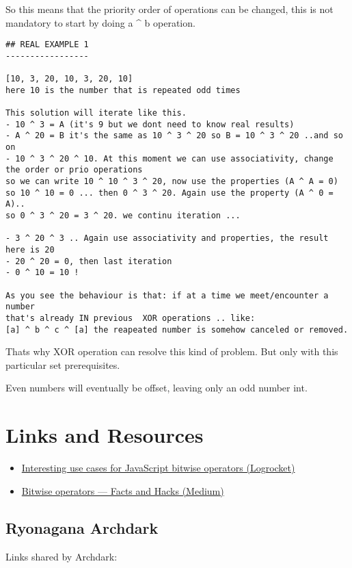 \documentclass[11pt]{article}
\begin{document}
So this means that the priority order of operations can be changed, this is not mandatory to start by doing a \^{} b operation.

\begin{verbatim}
## REAL EXAMPLE 1
-----------------

[10, 3, 20, 10, 3, 20, 10]
here 10 is the number that is repeated odd times

This solution will iterate like this.
- 10 ^ 3 = A (it's 9 but we dont need to know real results)
- A ^ 20 = B it's the same as 10 ^ 3 ^ 20 so B = 10 ^ 3 ^ 20 ..and so on
- 10 ^ 3 ^ 20 ^ 10. At this moment we can use associativity, change
the order or prio operations
so we can write 10 ^ 10 ^ 3 ^ 20, now use the properties (A ^ A = 0)
so 10 ^ 10 = 0 ... then 0 ^ 3 ^ 20. Again use the property (A ^ 0 = A)..
so 0 ^ 3 ^ 20 = 3 ^ 20. we continu iteration ...

- 3 ^ 20 ^ 3 .. Again use associativity and properties, the result here is 20
- 20 ^ 20 = 0, then last iteration
- 0 ^ 10 = 10 !

As you see the behaviour is that: if at a time we meet/encounter a number
that's already IN previous  XOR operations .. like:
[a] ^ b ^ c ^ [a] the reapeated number is somehow canceled or removed.
\end{verbatim}


Thats why XOR operation can resolve this kind of problem. But only with this particular set prerequisites.

Even numbers will eventually be offset, leaving only an odd number int.



\section{Links and Resources}
\label{sec:org656a7a6}
\begin{itemize}
\item \href{https://blog.logrocket.com/interesting-use-cases-for-javascript-bitwise-operators/}{Interesting use cases for JavaScript bitwise operators (Logrocket)}
\item \href{https://medium.com/@shashankmohabia/bitwise-operators-facts-and-hacks-903ca516f28c}{Bitwise operators — Facts and Hacks (Medium)}
\end{itemize}


\subsection{Ryonagana Archdark}
\label{sec:org76826ef}
Links shared by Archdark:
\end{document}
